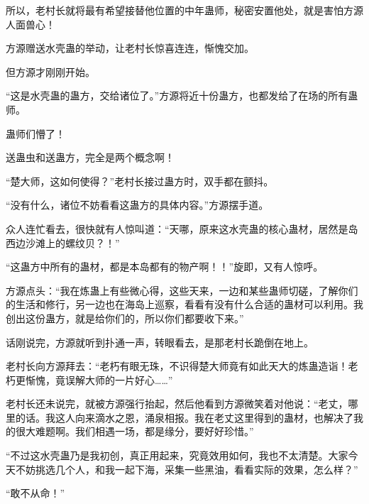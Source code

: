 \begin{this_body}
所以，老村长就将最有希望接替他位置的中年蛊师，秘密安置他处，就是害怕方源人面兽心！

方源赠送水壳蛊的举动，让老村长惊喜连连，惭愧交加。

但方源才刚刚开始。

“这是水壳蛊的蛊方，交给诸位了。”方源将近十份蛊方，也都发给了在场的所有蛊师。

蛊师们懵了！

送蛊虫和送蛊方，完全是两个概念啊！

“楚大师，这如何使得？”老村长接过蛊方时，双手都在颤抖。

“没有什么，诸位不妨看看这蛊方的具体内容。”方源摆手道。

众人连忙看去，很快就有人惊叫道：“天哪，原来这水壳蛊的核心蛊材，居然是岛西边沙滩上的螺纹贝？！”

“这蛊方中所有的蛊材，都是本岛都有的物产啊！！”旋即，又有人惊呼。

方源点头：“我在炼蛊上有些微心得，这些天来，一边和某些蛊师切磋，了解你们的生活和修行，另一边也在海岛上巡察，看看有没有什么合适的蛊材可以利用。我创出这份蛊方，就是给你们的，所以你们都要收下来。”

话刚说完，方源就听到扑通一声，转眼看去，是那老村长跪倒在地上。

老村长向方源拜去：“老朽有眼无珠，不识得楚大师竟有如此天大的炼蛊造诣！老朽更惭愧，竟误解大师的一片好心……”

老村长还未说完，就被方源强行抬起，然后他看到方源微笑着对他说：“老丈，哪里的话。我这人向来滴水之恩，涌泉相报。我在老丈这里得到的蛊材，也解决了我的很大难题啊。我们相遇一场，都是缘分，要好好珍惜。”

“不过这水壳蛊乃是我初创，真正用起来，究竟效用如何，我也不太清楚。大家今天不妨挑选几个人，和我一起下海，采集一些黑油，看看实际的效果，怎么样？”

“敢不从命！”

\end{this_body}

